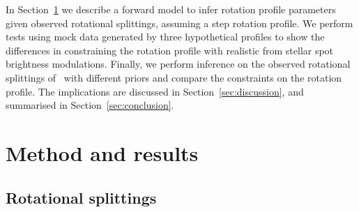 In Section~\ref{sec:methods_res} we describe a forward model to infer rotation profile parameters given observed rotational splittings, assuming a step rotation profile. 
We perform tests using mock data generated by three hypothetical profiles to show the differences in constraining the rotation profile with realistic from stellar spot brightness modulations. Finally, we perform inference on the observed rotational splittings of \thestar\ with different priors  and compare the constraints on the rotation profile. The implications are discussed in Section~\ref{sec:discussion}, and summarised in Section~\ref{sec:conclusion}.

\section{Method and results}
\label{sec:methods_res}
\subsection{Rotational splittings}

